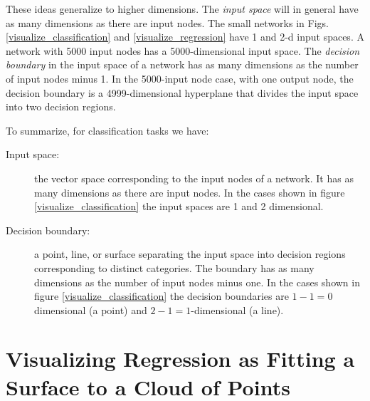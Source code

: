 These ideas generalize to higher dimensions. The \emph{input space} will in general have as many dimensions as there are input nodes. The small networks in Figs. \ref{visualize_classification} and \ref{visualize_regression}  have 1 and 2-d input spaces. A network with 5000 input nodes has a 5000-dimensional input space. The \emph{decision boundary} in the input space of a network has as many dimensions as the number of input nodes minus 1. In the 5000-input node case, with one output node, the decision boundary is a 4999-dimensional hyperplane that divides the input space into two decision regions.

To summarize, for classification tasks we have:
\begin{description}
\item[Input space:] the vector space corresponding to the input nodes of a network. It has as many dimensions as there are input nodes. In the cases shown in figure \ref{visualize_classification} the input spaces are 1 and 2 dimensional.
\item[Decision boundary:] a point, line, or surface separating the input space into decision regions corresponding to distinct categories. The boundary has as many dimensions as the number of input nodes minus one. In the cases shown in figure \ref{visualize_classification} the decision boundaries are $1-1=0$ dimensional (a point) and $2-1=1$-dimensional (a line). 
\end{description}
		
\section{Visualizing Regression as Fitting a Surface to a Cloud of Points}
\label{visRegression}

